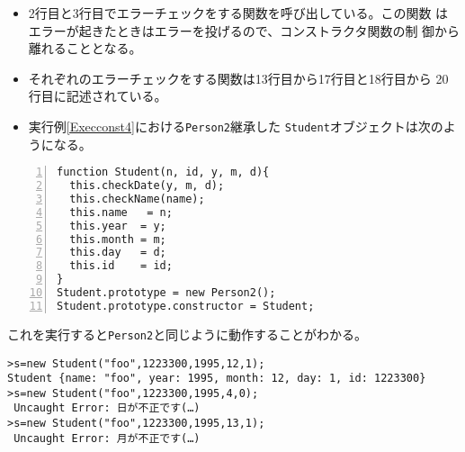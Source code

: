 \begin{Exec}
\begin{itemize}
 \item 2行目と3行目でエラーチェックをする関数を呼び出している。この関数
			 はエラーが起きたときはエラーを投げるので、コンストラクタ関数の制
			 御から離れることとなる。
 \item それぞれのエラーチェックをする関数は13行目から17行目と18行目から
			 20行目に記述されている。
 \item 実行例\ref{Execconst4}における\texttt{Person2}継承した
			 \texttt{Student}オブジェクトは次のようになる。
\end{itemize}
\begin{Verbatim}[numbers=left]
function Student(n, id, y, m, d){
  this.checkDate(y, m, d);
  this.checkName(name);
  this.name   = n;
  this.year  = y;
  this.month = m;
  this.day   = d;
  this.id    = id;
}
Student.prototype = new Person2();
Student.prototype.constructor = Student;
\end{Verbatim}
これを実行すると\texttt{Person2}と同じように動作することがわかる。
\begin{Verbatim}
>s=new Student("foo",1223300,1995,12,1);
Student {name: "foo", year: 1995, month: 12, day: 1, id: 1223300}
>s=new Student("foo",1223300,1995,4,0);
 Uncaught Error: 日が不正です(…)
>s=new Student("foo",1223300,1995,13,1);
 Uncaught Error: 月が不正です(…)
\end{Verbatim}

\end{Exec}
